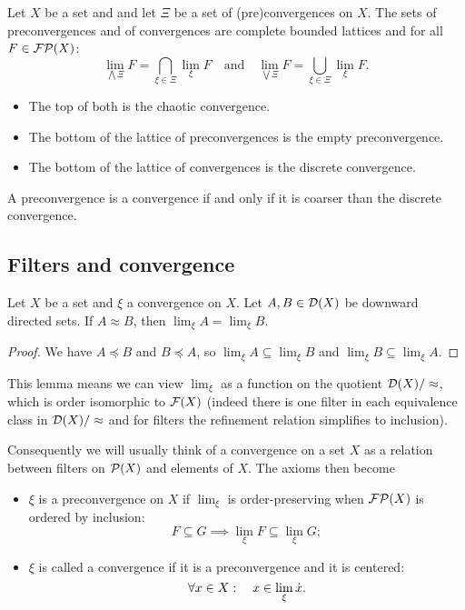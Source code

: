 \begin{proposition} \label{latticeConvergences}
Let $X$ be a set and and let $\Xi$ be a set of (pre)convergences on $X$. The sets of preconvergences and of convergences are complete bounded lattices and for all $F \in \operatorname{\mathcal{FP}}(X)$:
\[ \lim_{\bigwedge \Xi} F = \bigcap_{\xi\in\Xi}\lim_\xi F \quad\text{and}\quad \lim_{\bigvee \Xi} F = \bigcup_{\xi\in\Xi}\lim_\xi F. \]
\begin{itemize}
\item The top of both is the chaotic convergence.
\item The bottom of the lattice of preconvergences is the empty preconvergence.
\item The bottom of the lattice of convergences is the discrete convergence.
\end{itemize}
\end{proposition}

\begin{lemma}
A preconvergence is a convergence \textup{if and only if} it is coarser than the discrete convergence.
\end{lemma}


\subsection{Filters and convergence}
\begin{lemma}
Let $X$ be a set and $\xi$ a convergence on $X$. Let $A,B\in \operatorname{\mathcal{D}}(X)$ be downward directed sets. If $A \approx B$, then $\lim_\xi A = \lim_\xi B$.
\end{lemma}
\begin{proof}
We have $A \preceq B$ and $B \preceq A$, so $\lim_\xi A \subseteq \lim_\xi B$ and $\lim_\xi B \subseteq \lim_\xi A$.
\end{proof}
This lemma means we can view $\lim_\xi$ as a function on the quotient $\operatorname{\mathcal{D}}(X) /\approx$, which is order isomorphic to $\operatorname{\mathcal{F}}(X)$ (indeed there is one filter in each equivalence class in $\operatorname{\mathcal{D}}(X) /\approx$ and for filters the refinement relation simplifies to inclusion).

Consequently we will usually think of a convergence on a set $X$ as a relation between filters on $\operatorname{\mathcal{P}}(X)$ and elements of $X$. The axioms then become
\begin{itemize}
\item $\xi$ is a preconvergence on $X$ if $\lim_\xi$ is order-preserving when $\operatorname{\mathcal{FP}}(X)$ is ordered by inclusion:
\[ F \subseteq G \implies \lim_\xi F \subseteq \lim_\xi G; \]
\item $\xi$ is called a convergence if it is a preconvergence and it is centered:
\[ \forall x\in X: \quad x\in \lim_\xi \dot{x}. \]
\end{itemize}

